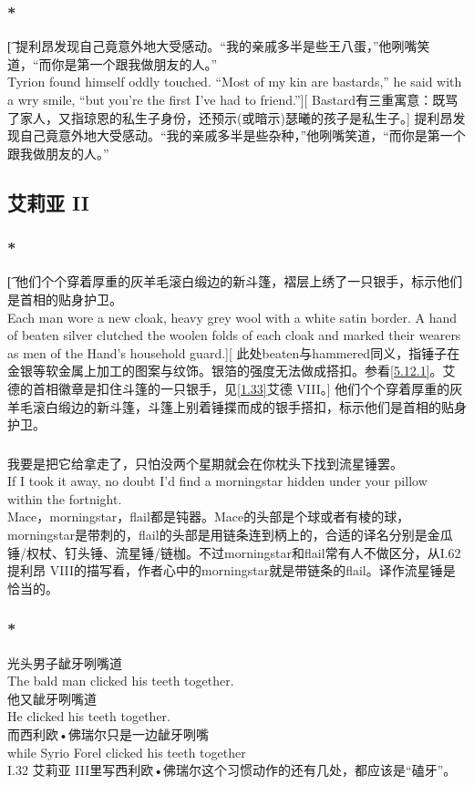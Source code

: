 \documentclass[12pt,a4paper]{article}
\newcommand{\h}[1]{{\color{red}#1}\\}
\newcommand{\la}[1]{{\color{blue}#1}\\}
\begin{document}
\subsubsection{\color{red}*}\t[
	提利昂发现自己竟意外地大受感动。“我的亲戚多半是些王八蛋，”他咧嘴笑道，“而你是第一个跟我做朋友的人。”\\
	Tyrion found himself oddly touched. “Most of my kin are bastards,” he said with a wry smile, “but you're the first I've had to friend.”][
	Bastard有三重寓意：既骂了家人，又指琼恩的私生子身份，还预示(或暗示)瑟曦的孩子是私生子。]
	提利昂发现自己竟意外地大受感动。“我的亲戚多半是些杂种，”他咧嘴笑道，“而你是第一个跟我做朋友的人。”				
\subsection{艾莉亚 II}
\subsubsection{\color{red}*}\label{1.22.1}\t[
	他们个个穿着厚重的灰羊毛滚白缎边的新斗篷，褶层上绣了一只银手，标示他们是首相的贴身护卫。\\
	Each man wore a new cloak, heavy grey wool with a white satin border. A hand of beaten silver clutched the woolen folds of each cloak and marked their wearers as men of the Hand's household guard.][
	此处beaten与hammered同义，指锤子在金银等软金属上加工的图案与纹饰。银箔的强度无法做成搭扣。参看\ref{5.12.1}。艾德的首相徽章是扣住斗篷的一只银手，见\ref{1.33}艾德 VIII。]
	他们个个穿着厚重的灰羊毛滚白缎边的新斗篷，斗篷上别着锤揲而成的银手搭扣，标示他们是首相的贴身护卫。
	
\subsubsection{}\la{
	我要是把它给拿走了，只怕没两个星期就会在你枕头下找到流星锤罢。\\
	If I took it away, no doubt I'd find a morningstar hidden under your pillow within the fortnight.}\h{
	Mace，morningstar，flail都是钝器。Mace的头部是个球或者有棱的球，morningstar是带刺的，flail的头部是用链条连到柄上的，合适的译名分别是金瓜锤/权杖、钉头锤、流星锤/链枷。不过morningstar和flail常有人不做区分，从I.62 提利昂 VIII的描写看，作者心中的morningstar就是带链条的flail。译作流星锤是恰当的。}
	
\subsubsection{\color{red}*}\la{
光头男子龇牙咧嘴道\\
The bald man clicked his teeth together.\\
他又龇牙咧嘴道\\
He clicked his teeth together.\\
而西利欧•佛瑞尔只是一边龇牙咧嘴\\
while Syrio Forel clicked his teeth together}\h{
I.32 艾莉亚 III里写西利欧•佛瑞尔这个习惯动作的还有几处，都应该是“磕牙”。}
\end{document}
